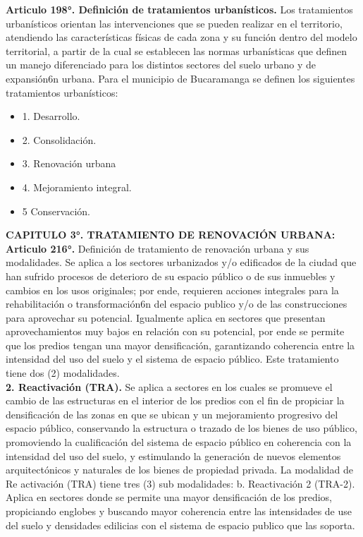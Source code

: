\documentclass[12pt,a4paper,twoside]{article}
\begin{document}
\textbf{Articulo 198°. Definición de tratamientos urbanísticos.} Los tratamientos urbanísticos orientan las
intervenciones que se pueden realizar en el territorio, atendiendo las características físicas de cada
zona y su función dentro del modelo territorial, a partir de la cual se establecen las normas urbanísticas
que definen un manejo diferenciado para los distintos sectores del suelo urbano y de expansión6n urbana.
Para el municipio de Bucaramanga se definen los siguientes tratamientos urbanísticos:
\begin{itemize}
	\item 1. Desarrollo.
	\item 2. Consolidación.
	\item 3. Renovación urbana
	\item 4. Mejoramiento integral.
	\item 5 Conservación.
\end{itemize}

\textbf{CAPITULO 3°. TRATAMIENTO DE RENOVACIÓN URBANA:} \\

\textbf{Articulo 216°.} Definición de tratamiento de renovación urbana y sus modalidades. Se aplica a
los sectores urbanizados y/o edificados de la ciudad que han sufrido procesos de deterioro de su
espacio público o de sus inmuebles y cambios en los usos originales; por ende, requieren acciones
integrales para la rehabilitación o transformación6n del espacio publico y/o de las construcciones para
aprovechar su potencial. Igualmente aplica en sectores que presentan aprovechamientos muy bajos
en relación con su potencial, por ende se permite que los predios tengan una mayor densificación,
garantizando coherencia entre la intensidad del uso del suelo y el sistema de espacio público. Este
tratamiento tiene dos (2) modalidades.\\

\textbf{2. Reactivación (TRA).} Se aplica a sectores en los cuales se promueve el cambio de las estructuras
en el interior de los predios con el fin de propiciar la densificación de las zonas en que se ubican y un
mejoramiento progresivo del espacio público, conservando la estructura o trazado de los bienes de
uso público, promoviendo la cualificación del sistema de espacio público en coherencia con la
intensidad del uso del suelo, y estimulando la generación de nuevos elementos arquitectónicos y
naturales de los bienes de propiedad privada.
La modalidad de Re activación (TRA) tiene tres (3) sub modalidades:
b. Reactivación 2 (TRA-2). Aplica en sectores donde se permite una mayor densificación de los predios, propiciando englobes y buscando mayor coherencia entre las intensidades de use del suelo y densidades edilicias con el sistema de espacio publico que las soporta.
\end{document}
